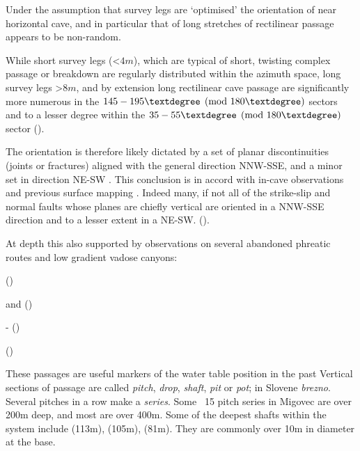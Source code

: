 Under the assumption that survey legs are `optimised'  the orientation of near horizontal cave, and in particular that of long stretches of rectilinear passage appears to be non-random. 

While short survey legs (<$4m$), which are typical of short, twisting complex passage or breakdown are regularly distributed within the azimuth space, long survey legs >$8m$, and by extension long rectilinear cave passage are significantly more numerous in the $145-195\textdegree  \pmod{180\textdegree}$  sectors and to a lesser degree within the $35-55\textdegree   \pmod{180\textdegree }$ sector ().

The orientation is therefore likely dictated by a set of planar discontinuities (joints or fractures) aligned with the general direction NNW-SSE, and a minor set in direction NE-SW . This conclusion is in accord with in-cave observations \citep{hm1}  and previous surface mapping \citep{buser1986tolmavc} . Indeed many, if not all of the strike-slip and normal faults whose planes are chiefly vertical are oriented in a NNW-SSE direction and to a lesser extent in a NE-SW. ().

At depth this also supported by observations on several abandoned phreatic routes and low gradient vadose canyons:
 
\begin{citemize} 
\item {} ()
\item {} and   ()
 \item {} -  ()
 \item {} ()
 \end{citemize} 

These passages are useful markers of the water table position in the past
 Vertical sections of passage are called \emph{pitch}, \emph{drop}, \emph{shaft}, \emph{pit} or \emph{pot}; in Slovene \emph{brezno}. 
 Several pitches in a row make a \emph{series}. Some ~15 pitch series in Migovec are over 200m deep, and most are over 400m.
Some of the deepest shafts within the system include  (113m),  (105m),  (81m). They are commonly over 10m in diameter at the base. 

